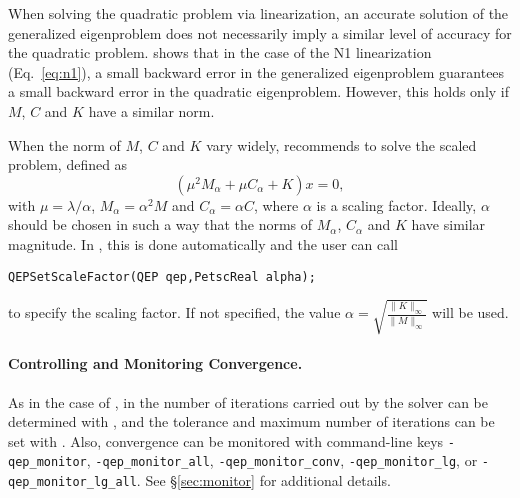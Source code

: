 When solving the quadratic problem via linearization, an accurate solution of the generalized eigenproblem does not necessarily imply a similar level of accuracy for the quadratic problem. \cite{Tisseur:2000:BEC} shows that in the case of the N1 linearization (Eq.\ \ref{eq:n1}), a small backward error in the generalized eigenproblem guarantees a small backward error in the quadratic eigenproblem. However, this holds only if $M$, $C$ and $K$ have a similar norm.

When the norm of $M$, $C$ and $K$ vary widely, \cite{Tisseur:2000:BEC} recommends to solve the scaled problem, defined as 
\begin{equation}
(\mu^2M_\alpha+\mu C_\alpha+K)x=0,\label{eq:scaled}
\end{equation}
with $\mu=\lambda/\alpha$, $M_\alpha=\alpha^2M$ and $C_\alpha=\alpha C$, where $\alpha$ is a scaling factor. Ideally, $\alpha$ should be chosen in such a way that the norms of $M_\alpha$, $C_\alpha$ and $K$ have similar magnitude. In \slepc, this is done automatically and the user can call
	\begin{Verbatim}[fontsize=\small]
	QEPSetScaleFactor(QEP qep,PetscReal alpha);
	\end{Verbatim}
to specify the scaling factor. If not specified, the value $\alpha=\sqrt{\frac{\|K\|_\infty}{\|M\|_\infty}}$ will be used.

\paragraph{Controlling and Monitoring Convergence.}

As in the case of , in  the number of iterations carried out by the solver can be determined with , and the tolerance and maximum number of iterations can be set with . Also, convergence can be monitored with command-line keys \Verb!-qep_monitor!, \Verb!-qep_monitor_all!, \Verb!-qep_monitor_conv!, \Verb!-qep_monitor_lg!, or \Verb!-qep_monitor_lg_all!. See \S\ref{sec:monitor} for additional details.

